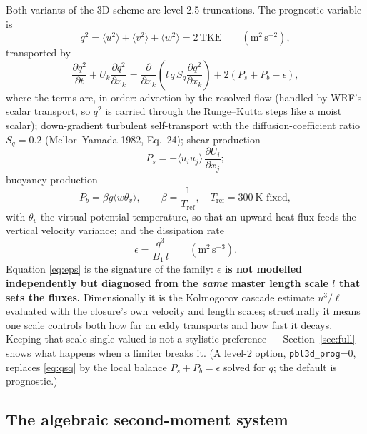 \documentclass[10pt,a4paper]{article}
\newcommand{\keytag}[1]{\colorbox{keyc}{\textcolor{white}{\sffamily\bfseries\scriptsize K#1}}}
\newcommand{\key}[1]{\marginpar[\raggedleft\keytag{#1}]{\raggedright\keytag{#1}}\ignorespaces}
\newcommand{\kh}[1]{{\color{keyc!80!black}\bfseries #1}}
\newcommand{\avg}[1]{\langle #1 \rangle}
\newcommand{\pd}[2]{\frac{\partial #1}{\partial #2}}
\begin{document}
Both variants of the 3D scheme are level-2.5 truncations. The prognostic variable is
\begin{equation}
q^2 = \avg{u^2}+\avg{v^2}+\avg{w^2} = 2\,\mathrm{TKE}
\qquad (\text{m}^2\,\text{s}^{-2}),
\end{equation}
transported by
\begin{equation}
\pd{q^2}{t} + U_k \pd{q^2}{x_k}
 = \pd{}{x_k}\!\left( l\, q\, S_q \pd{q^2}{x_k} \right)
   + 2\left( P_s + P_b - \epsilon \right),
\label{eq:qsq}
\end{equation}
where the terms are, in order: advection by the resolved flow (handled by WRF's scalar transport, so $q^2$ is carried through the Runge--Kutta steps like a moist scalar); down-gradient turbulent self-transport with the diffusion-coefficient ratio $S_q = 0.2$ (Mellor--Yamada 1982, Eq.~24); shear production
\begin{equation}
P_s = -\avg{u_i u_j}\,\pd{U_i}{x_j};
\label{eq:ps}
\end{equation}
buoyancy production
\begin{equation}
P_b = \beta g \avg{w\theta_v},
\qquad \beta = \frac{1}{T_\mathrm{ref}},\quad T_\mathrm{ref}=300\ \text{K fixed},
\end{equation}
with $\theta_v$ the virtual potential temperature, so that an upward heat flux feeds the vertical velocity variance; and the dissipation rate
\begin{equation}
\epsilon = \frac{q^3}{B_1\, l}
\qquad (\text{m}^2\,\text{s}^{-3}).
\label{eq:eps}
\end{equation}
\key{3}Equation \eqref{eq:eps} is the signature of the family: \kh{$\epsilon$ is not modelled independently but diagnosed from the \emph{same} master length scale $l$ that sets the fluxes.} Dimensionally it is the Kolmogorov cascade estimate $u^3/\ell$ evaluated with the closure's own velocity and length scales; structurally it means one scale controls both how far an eddy transports and how fast it decays. Keeping that scale single-valued is not a stylistic preference — Section~\ref{sec:full} shows what happens when a limiter breaks it. (A level-2 option, \texttt{pbl3d\_prog}=0, replaces \eqref{eq:qsq} by the local balance $P_s + P_b = \epsilon$ solved for $q$; the default is prognostic.)

\subsection{The algebraic second-moment system}
\end{document}
